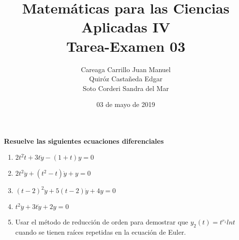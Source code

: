 \documentclass{article}
\title{
    Matemáticas para las Ciencias Aplicadas IV\\
    Tarea-Examen 03 
}
\author{
    Careaga Carrillo Juan Manuel \\
    Quiróz Castañeda Edgar \\
    Soto Corderi Sandra del Mar
}
\date{
    03 de mayo de 2019
}
\begin{document}
    \maketitle
    {\bf Resuelve las siguientes ecuaciones diferenciales}
    \begin{enumerate}
        \item {
            $2 t^2 \ddot t+ 3t \dot y - (1 + t)y=0$\\
            \color{azul}
            
            
            
        }
        \item {
           $2 t^2 \ddot y+ (t^2 - t) \dot y + y=0$\\

            \color{azul}
            
            
        }
        \item {
            $(t - 2)^2 \ddot y + 5(t-2)\dot y+4y=0$\\

            \color{azul}
            
        }
        \item {
            $t^2 \ddot y+ 3t \dot y + 2y =0$\\

            \color{azul}
            
        }
        \item {
            Usar el método de reducción de orden para demostrar que $y_2(t) = t ^ {r_1} ln t$ cuando se tienen raíces repetidas en la ecuación de Euler. 

            \color{azul}
           
        }
    \end{enumerate}
\end{document}
